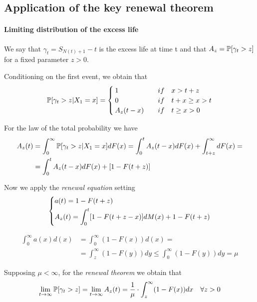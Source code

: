 \subsection{Application of the key renewal theorem}

\paragraph{Limiting distribution of the excess life}

We say that $\gamma_{t}=S_{N(t)+1}-t$ is the excess life at time t and that $A_z=\mathbb{P}[\gamma_t>z]$ for a fixed parameter $z>0$.

Conditioning on the first event, we obtain that
\begin{equation*}
	\mathbb{P}[\gamma_t>z|X_1=x] = \begin{cases}
		1 \quad & if \quad x > t+z \\
		0 \quad & if \quad t+x \geq x > t \\
		A_z(t-x) \quad & if \quad t \geq x > 0
	\end{cases}
\end{equation*}

For the law of the total probability we have
\begin{align*}
	A_z(t) &= \int_{0}^{\infty} \mathbb{P}[\gamma_t>z|X_1=x] dF(x) = \int_{0}^{t}A_z(t-x)dF(x)+\int_{t+z}^{\infty}dF(x)= \\
	&= \int_{0}^{t}A_z(t-x)dF(x)+ [1-F(t+z)]
\end{align*}

Now we apply the \textit{renewal equation} setting
\begin{equation} \begin{dcases}
	a(t) = 1 - F(t+z) \\
	A_z(t)=\int_{0}^{t} [1-F(t+z-x)] dM(x)+1-F(t+z)
\end{dcases} \end{equation}

\begin{align*}
	\int_{0}^{\infty} a(x) d(x) & = \int_{0}^{\infty}(1-F(x)) d(x) = \\
	& = \int_{z}^{\infty}(1-F(y))dy \leq \int_{0}^{\infty}(1-F(y))dy = \mu
\end{align*}

Supposing $\mu < \infty$, for the \textit{renewal theorem} we obtain that
\begin{equation}
	\lim_{t \rightarrow \infty} \mathbb{P}[\gamma_t>z] = \lim_{t \rightarrow \infty} A_z(t) = \frac{1}{\mu} \cdot \int_z^{\infty}(1-F(x))dx \quad \forall z > 0
	\label{limitingdistribution}
\end{equation}

